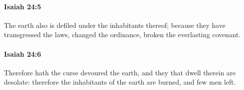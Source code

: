 		\paragraph{Isaiah 24:5} %
			\label{ISAIAH-24-5}

			The earth also is defiled under the inhabitants thereof; because they have transgressed the laws, changed the ordinance, broken the everlasting covenant.


		\paragraph{Isaiah 24:6} %
			\label{ISAIAH-24-6}

			Therefore hath the curse devoured the earth, and they that dwell therein are desolate: therefore the inhabitants of the earth are burned, and few men left.


